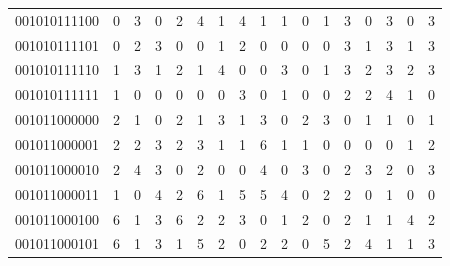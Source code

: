 \documentclass[10pt,a4paper]{article}
\begin{document}
\begin{longtable}{ |c|c|c|c|c|c|c|c|c|c|c|c|c|c|c|c|c| }
    001010111100              & 0                            & 3                                & 0                            & 2                              & 4   & 1   & 4   & 1   & 1   & 0   & 1   & 3   & 0   & 3   & 0   & 3   \\
    001010111101              & 0                            & 2                                & 3                            & 0                              & 0   & 1   & 2   & 0   & 0   & 0   & 0   & 3   & 1   & 3   & 1   & 3   \\
    001010111110              & 1                            & 3                                & 1                            & 2                              & 1   & 4   & 0   & 0   & 3   & 0   & 1   & 3   & 2   & 3   & 2   & 3   \\
    001010111111              & 1                            & 0                                & 0                            & 0                              & 0   & 0   & 3   & 0   & 1   & 0   & 0   & 2   & 2   & 4   & 1   & 0   \\
    001011000000              & 2                            & 1                                & 0                            & 2                              & 1   & 3   & 1   & 3   & 0   & 2   & 3   & 0   & 1   & 1   & 0   & 1   \\
    001011000001              & 2                            & 2                                & 3                            & 2                              & 3   & 1   & 1   & 6   & 1   & 1   & 0   & 0   & 0   & 0   & 1   & 2   \\
    001011000010              & 2                            & 4                                & 3                            & 0                              & 2   & 0   & 0   & 4   & 0   & 3   & 0   & 2   & 3   & 2   & 0   & 3   \\
    001011000011              & 1                            & 0                                & 4                            & 2                              & 6   & 1   & 5   & 5   & 4   & 0   & 2   & 2   & 0   & 1   & 0   & 0   \\
    001011000100              & 6                            & 1                                & 3                            & 6                              & 2   & 2   & 3   & 0   & 1   & 2   & 0   & 2   & 1   & 1   & 4   & 2   \\
    001011000101              & 6                            & 1                                & 3                            & 1                              & 5   & 2   & 0   & 2   & 2   & 0   & 5   & 2   & 4   & 1   & 1   & 3   \\

\end{longtable}
\end{document}
